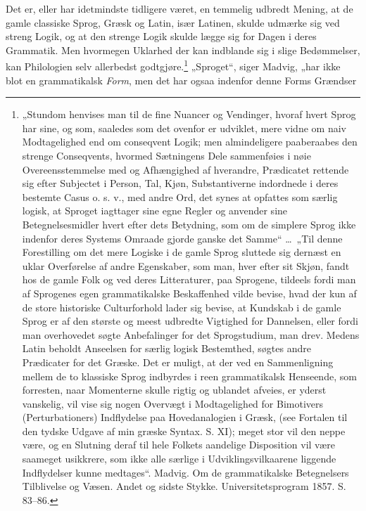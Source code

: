 \documentclass[12pt]{book}
\newcommand{\opage}[1]{\marginnote{\footnotesize\textit{[#1]}}}
\begin{document}
Det er, eller har idetmindste tidligere været, en temmelig
udbredt Mening, at de gamle classiske Sprog, Græsk og
Latin, især Latinen, skulde udmærke sig ved streng Logik, og
at den strenge Logik skulde lægge sig for Dagen i deres
Grammatik. Men hvormegen Uklarhed der kan indblande sig i
slige Bedømmelser, kan Philologien selv allerbedst godtgjøre.\footnote{%
„Stundom henvises man til de fine Nuancer og Vendinger, hvoraf
hvert Sprog har sine, og som, saaledes som det ovenfor er
udviklet, mere vidne om naiv Modtagelighed end om conseqvent Logik;
men almindeligere paaberaabes den strenge Conseqvents, hvormed
Sætningens Dele sammenføies i nøie Overeensstemmelse med og
Afhængighed af hverandre, Prædicatet rettende sig efter Subjectet i
Person, Tal, Kjøn, Substantiverne indordnede i deres bestemte
Casus o. s. v., med andre Ord, det synes at opfattes som særlig
logisk, at Sproget iagttager sine egne Regler og anvender sine
Betegnelsesmidler hvert efter dets Betydning, som om de simplere
Sprog ikke indenfor deres Systems Omraade gjorde ganske det
Samme“ \ldots\ „Til denne Forestilling om det mere Logiske i de
gamle Sprog sluttede sig dernæst en uklar Overførelse af andre
Egenskaber, som man, hver efter sit Skjøn, fandt hos de gamle
Folk og ved deres Litteraturer, paa Sprogene, tildeels fordi man
af Sprogenes egen grammatikalske Beskaffenhed vilde bevise, hvad
der kun af de store historiske Culturforhold lader sig bevise, at
Kundskab i de gamle Sprog er af den største og meest udbredte
Vigtighed for Dannelsen, eller fordi man overhovedet søgte
Anbefalinger for det Sprogstudium, man drev. Medens Latin
beholdt Anseelsen for særlig logisk Bestemthed, søgtes andre
Prædicater for det Græske. Det er muligt, at der ved en
Sammenligning mellem de to klassiske Sprog indbyrdes i reen grammatikalsk
Henseende, som forresten, naar Momenterne skulle rigtig og ublandet
afveies, er yderst vanskelig, vil vise sig nogen Overvægt i
Modtagelighed for Bimotivers (Perturbationers) Indflydelse paa
Hovedanalogien i Græsk, (see Fortalen til den tydske Udgave af min
græske Syntax. S. XI); meget stor vil den neppe være, og en
Slutning deraf til hele Folkets aandelige Disposition vil være
saameget usikkrere, som ikke alle særlige i Udviklingsvilkaarene
liggende Indflydelser kunne medtages“. Madvig. Om de
grammatikalske Betegnelsers Tilblivelse og Væsen. Andet og sidste Stykke.
Universitetsprogram 1857. S. 83--86.}
\opage{44}„Sproget“, siger Madvig, „har ikke blot en grammatikalsk
\emph{Form}, men det har ogsaa indenfor denne Forms Grændser
\end{document}
